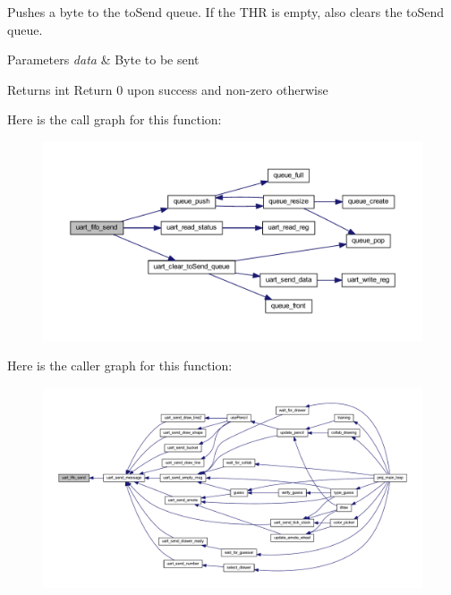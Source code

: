 Pushes a byte to the to\+Send queue. If the T\+HR is empty, also clears the to\+Send queue. 


\begin{DoxyParams}{Parameters}
{\em data} & Byte to be sent \\
\hline
\end{DoxyParams}
\begin{DoxyReturn}{Returns}
int Return 0 upon success and non-\/zero otherwise 
\end{DoxyReturn}
Here is the call graph for this function\+:\nopagebreak
\begin{figure}[H]
\begin{center}
\leavevmode
\includegraphics[width=350pt]{group__uart_ga583930d9069e797391526134f24113ce_cgraph}
\end{center}
\end{figure}
Here is the caller graph for this function\+:\nopagebreak
\begin{figure}[H]
\begin{center}
\leavevmode
\includegraphics[width=350pt]{group__uart_ga583930d9069e797391526134f24113ce_icgraph}
\end{center}
\end{figure}
\mbox{\label{group__uart_ga488f8e4b1795dcbe268f9629176c0740}} 
